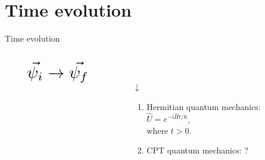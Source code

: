 \documentclass[10pt]{beamer}
\newcommand*{\Scale}[2][4]{\scalebox{#1}{\ensuremath{#2}}}%
\begin{document}
\section{Time evolution}
\begin{frame}{Time evolution}
\vspace{-1cm}
\hspace{-2em}
\vspace{2cm}
\begin{columns}[T]
    \begin{column}{0.3\textwidth}
    \vspace{-2cm}
    \begin{align*}
    &\Scale[2]{\vec{\psi_{i}} \rightarrow{} \vec{\psi_{f}}}
    \end{align*}
    \pause
    \hspace{6em}
    \Scale[2.2]{\hookrightarrow}
    \end{column}
    
    \begin{column}{0.8\textwidth}
    \vspace{-1.3cm}
    \Scale[3]{\vec{\psi_{f}} = \hat{U} \vec{\psi_{i}}}\\
    \pause
    \hspace{6.8em}
    \begin{huge}
    {$\downarrow$}\\
    \end{huge}
    \begin{enumerate}
    \item \textcolor{myNewColorA}{Hermitian} quantum mechanics:\\
    \hspace{5em}
    $\hat{U} = e^{-i\hat{H}t / \hbar}$,\\
    \hspace{5em}
    where $t > 0$.
    \vspace{0.3cm}
    \pause
    \item \textcolor{myNewColorC}{CPT} quantum mechanics: \textcolor{myNewColorC}{\large{?}}
    \end{enumerate}
    \end{column}
    \end{columns}
\end{frame}
\end{document}
